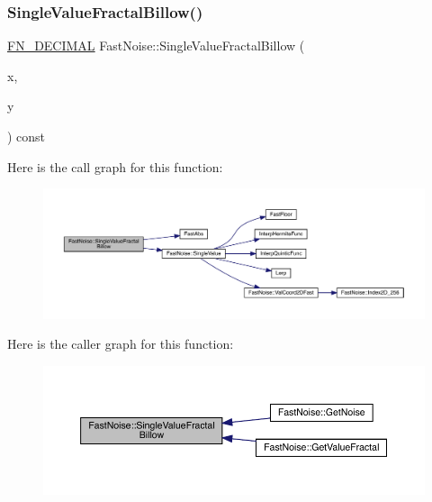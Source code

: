 \subsubsection{\texorpdfstring{Single\+Value\+Fractal\+Billow()}{SingleValueFractalBillow()}\hspace{0.1cm}{\footnotesize\ttfamily [1/2]}}
{\footnotesize\ttfamily \mbox{\hyperlink{_fast_noise_8h_a75a9ef6d2541c4921815b885bfd449c3}{F\+N\+\_\+\+D\+E\+C\+I\+M\+AL}} Fast\+Noise\+::\+Single\+Value\+Fractal\+Billow (\begin{DoxyParamCaption}\item[{\mbox{\hyperlink{_fast_noise_8h_a75a9ef6d2541c4921815b885bfd449c3}{F\+N\+\_\+\+D\+E\+C\+I\+M\+AL}}}]{x,  }\item[{\mbox{\hyperlink{_fast_noise_8h_a75a9ef6d2541c4921815b885bfd449c3}{F\+N\+\_\+\+D\+E\+C\+I\+M\+AL}}}]{y }\end{DoxyParamCaption}) const\hspace{0.3cm}{\ttfamily [private]}}

Here is the call graph for this function\+:
\nopagebreak
\begin{figure}[H]
\begin{center}
\leavevmode
\includegraphics[width=350pt]{class_fast_noise_a9ce9cdb72f3c9acaf76511d723e8e1ae_cgraph}
\end{center}
\end{figure}
Here is the caller graph for this function\+:
\nopagebreak
\begin{figure}[H]
\begin{center}
\leavevmode
\includegraphics[width=350pt]{class_fast_noise_a9ce9cdb72f3c9acaf76511d723e8e1ae_icgraph}
\end{center}
\end{figure}
\mbox{\label{class_fast_noise_ac2534a36b0dfb1c6337a512787511754}} 
